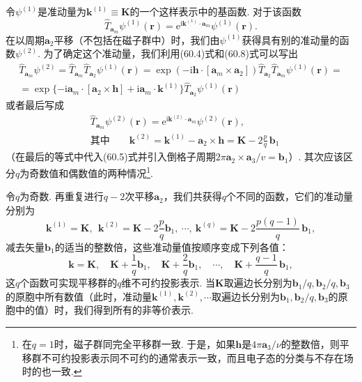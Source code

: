 令$\psi^{(1)}$是准动量为$\bm k^{(1)}\equiv\bm K$的一个这样表示中的基函数. 对于该函数
\begin{equation}
\hat T_{\bm a_m}\psi^{(1)}(\bm r)=\mathrm e^{\mathrm i\bm k^{(1)}\cdot\bm a_m}\psi^{(1)}(\bm r).
\label{60.8}
\end{equation}
在以周期$\bm a_2$平移（不包括在磁子群中）时，我们由$\psi^{(1)}$获得具有别的准动量的函数$\psi^{(2)}$. 为了确定这个准动量，我们利用(60.4)式和(60.8)式可以写出
\begin{equation*}
\begin{aligned}
\hat T_{\bm a_m}\psi^{(2)}=\hat T_{\bm a_m}\hat T_{\bm a_2}\psi^{(1)}(\bm r)
=\exp(-\mathrm i\bm h\cdot[\bm a_m\times\bm a_2])\hat T_{\bm a_2}\hat T_{\bm a_m}\psi^{(1)}(\bm r)=\\
=\exp\{-\mathrm i\bm a_m\cdot[\bm a_2\times\bm h]+\mathrm i\bm a_m\cdot\bm k^{(1)}\}\hat T_{\bm a_2}\psi^{(1)}(\bm r)
\end{aligned}
\end{equation*}
或者最后写成
\begin{equation*}
\begin{aligned}
&\hat T_{\bm a_m}\psi^{(2)}(\bm r)=\mathrm e^{\mathrm i\bm k^{(2)}\cdot\bm a_m}\psi^{(2)}(\bm r),\\
&\text{其中}\qquad
\bm k^{(2)}=\bm k^{(1)}-\bm a_2\times\bm h=\bm K-2\frac{p}{q}\,\bm b_1
\end{aligned}
\end{equation*}
（在最后的等式中代入(60.5)式并引入倒格子周期$2\pi\bm a_2\times\bm a_3/v=\bm b_1$）. 其次应该区分$q$为奇数值和偶数值的两种情况\footnote{在$q=1$时，磁子群同完全平移群一致. 于是，如果$\bm h$是$4\pi\bm a_3/\nu$的整数倍，则平移群不可约投影表示同不可约的通常表示一致，而且电子态的分类与不存在场时的也一致.}.

令$q$为奇数. 再重复进行$q-2$次平移$\bm a_2$，我们共获得$q$个不同的函数，它们的准动量分别为
\begin{equation}
\bm k^{(1)}=\bm K,\ \ \bm k^{(2)}=\bm K-2\frac{p}{q}\bm b_1,\ \cdots,\ 
\bm k^{(q)}=\bm K-2\frac{p(q-1)}{q}\,\bm b_1,
\label{60.9}
\end{equation}
减去矢量$\bm b_1$的适当的整数倍，这些准动量值按顺序变成下列各值：
\begin{equation}
\bm k=\bm K,\quad\bm K+\frac{1}{q}\bm b_1,\quad\bm K+\frac{2}{q}\bm b_1,\quad\cdots,\quad
\bm K+\frac{q-1}{q}\,\bm b_1,
\label{60.10}
\end{equation}
这$q$个函数可实现平移群的$q$维不可约投影表示. 当$\bm K$取遍边长分别为$\bm b_1/q,\bm b_2/q,\bm b_3$的原胞中所有数值（此时，准动量$\bm k^{(1)},\bm k^{(2)},\cdots$取遍边长分别为$\bm b_1,\bm b_2/q,\bm b_3$的原胞中的值）时，我们得到所有的非等价表示.

